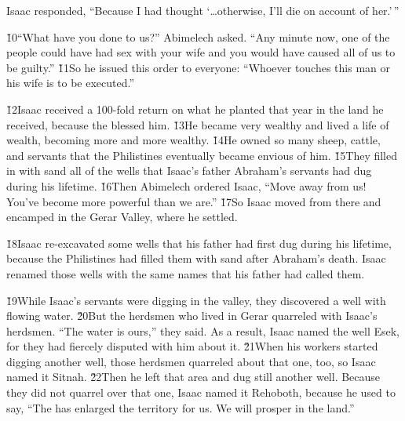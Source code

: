 Isaac responded, ``Because I had thought `{\ldots}otherwise, I'll die on account of her.'\,''

\v{10}``What have you done to us?'' Abimelech asked. ``Any minute now, one of the people could have had sex with your wife and you would have caused all of us to be guilty.'' \v{11}So he issued this order to everyone: ``Whoever touches this man or his wife is to be executed.''

\v{12}Isaac received a 100-fold return on what he planted that year in the land he received, because the  blessed him. \v{13}He became very wealthy and lived a life of wealth, becoming more and more wealthy. \v{14}He owned so many sheep, cattle, and servants that the Philistines eventually became envious of him. \v{15}They filled in with sand all of the wells that Isaac's father Abraham's servants had dug during his lifetime. \v{16}Then Abimelech ordered Isaac, ``Move away from us! You've become more powerful than we are.'' \v{17}So Isaac moved from there and encamped in the Gerar Valley, where he settled.

\v{18}Isaac re-excavated some wells that his father had first dug during his lifetime, because the Philistines had filled them with sand after Abraham's death. Isaac renamed those wells with the same names that his father had called them.

\v{19}While Isaac's servants were digging in the valley, they discovered a well with flowing water. \v{20}But the herdsmen who lived in Gerar quarreled with Isaac's herdsmen. ``The water is ours,'' they said. As a result, Isaac named the well Esek, for they had fiercely disputed with him about it. \v{21}When his workers started digging another well, those herdsmen quarreled about that one, too, so Isaac named it Sitnah. \v{22}Then he left that area and dug still another well. Because they did not quarrel over that one, Isaac named it Rehoboth, because he used to say, ``The  has enlarged the territory for us. We will prosper in the land.''

